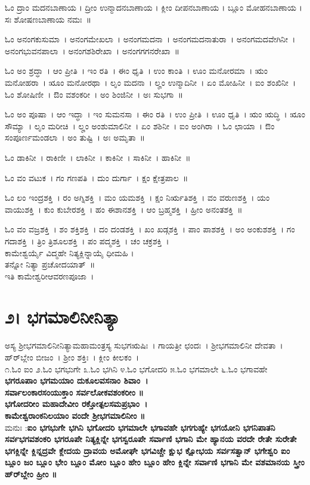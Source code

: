 ಓಂ ದ್ರಾಂ ಮದನಬಾಣಾಯ ।  ದ್ರೀಂ ಉನ್ಮಾದನಬಾಣಾಯ ।  ಕ್ಲೀಂ ದೀಪನಬಾಣಾಯ ।  ಬ್ಲೂಂ ಮೋಹನಬಾಣಾಯ ।  ಸಃ ಶೋಷಣಬಾಣಾಯ ನಮಃ~॥

ಓಂ ಅನಂಗಕುಸುಮಾ~।  ಅನಂಗಮೇಖಲಾ~।  ಅನಂಗಮದನಾ~।  ಅನಂಗಮದನಾತುರಾ~।  ಅನಂಗಮದವೇಗಿನೀ~।  ಅನಂಗಭುವನಪಾಲಾ~।  ಅನಂಗಶಶಿರೇಖಾ~।  ಅನಂಗಗಗನರೇಖಾ~॥ 

ಓಂ ಅಂ ಶ್ರದ್ಧಾ~।  ಆಂ ಪ್ರೀತಿ~।  ಇಂ ರತಿ~।  ಈಂ ಧೃತಿ~।  ಉಂ ಕಾಂತಿ~।  ಊಂ ಮನೋರಮಾ~।  ಋಂ ಮನೋಹರಾ~।  ೠಂ ಮನೋರಥಾ~।  ಲೃಂ ಮದನಾ~।  ಲೄಂ ಉನ್ಮಾದಿನೀ~।  ಏಂ ಮೋಹಿನೀ~।  ಐಂ ಶಂಖಿನೀ~। ಓಂ  ಶೋಷಿಣೀ~।  ಔಂ ವಶಂಕರೀ~।  ಅಂ ಶಿಂಜಿನೀ~।  ಅಃ ಸುಭಗಾ~॥ 

ಓಂ ಅಂ ಪೂಷಾ~।  ಆಂ ಇದ್ಧಾ~।  ಇಂ ಸುಮನಸಾ~।  ಈಂ ರತಿ~।  ಉಂ ಪ್ರೀತಿ~।  ಊಂ ಧೃತಿ~।  ಋಂ ಋದ್ಧಿ~।  ೠಂ ಸೌಮ್ಯಾ~।  ಲೃಂ ಮರೀಚಿ~।  ಲೄಂ ಅಂಶುಮಾಲಿನೀ~।  ಏಂ ಶಶಿನೀ~।  ಐಂ ಅಂಗಿರಾ~। ಓಂ ಛಾಯಾ~।  ಔಂ ಸಂಪೂರ್ಣಮಂಡಲಾ~।  ಅಂ ತುಷ್ಟಿ~।  ಅಃ ಅಮೃತಾ~॥ 

ಓಂ ಡಾಕಿನೀ~।  ರಾಕಿಣೀ~।  ಲಾಕಿನೀ~।  ಕಾಕಿನೀ~।  ಸಾಕಿನೀ~।  ಹಾಕಿನೀ~॥ 

ಓಂ ವಂ ವಟುಕ~।  ಗಂ ಗಣಪತಿ~।  ದುಂ ದುರ್ಗಾ~।  ಕ್ಷಂ ಕ್ಷೇತ್ರಪಾಲ~॥ 

ಓಂ ಲಂ ಇಂದ್ರಶಕ್ತಿ~।  ರಂ ಅಗ್ನಿಶಕ್ತಿ~।  ಮಂ ಯಮಶಕ್ತಿ~।  ಕ್ಷಂ ನಿರ್ಋತಿಶಕ್ತಿ~।  ವಂ ವರುಣಶಕ್ತಿ~।  ಯಂ ವಾಯುಶಕ್ತಿ~।  ಕುಂ ಕುಬೇರಶಕ್ತಿ~।  ಹಂ ಈಶಾನಶಕ್ತಿ~।  ಆಂ ಬ್ರಹ್ಮಶಕ್ತಿ~।  ಹ್ರೀಂ ಅನಂತಶಕ್ತಿ~॥ 

ಓಂ ವಂ ವಜ್ರಶಕ್ತಿ~।  ಶಂ ಶಕ್ತಿಶಕ್ತಿ~।  ದಂ ದಂಡಶಕ್ತಿ~।  ಖಂ ಖಡ್ಗಶಕ್ತಿ~।  ಪಾಂ ಪಾಶಶಕ್ತಿ~।  ಅಂ ಅಂಕುಶಶಕ್ತಿ~।  ಗಂ ಗದಾಶಕ್ತಿ~।  ತ್ರಿಂ ತ್ರಿಶೂಲಶಕ್ತಿ~।  ಪಂ ಪದ್ಮಶಕ್ತಿ~।  ಚಂ ಚಕ್ರಶಕ್ತಿ~।\\ ಕಾಮೇಶ್ವರ್ಯೈ ವಿದ್ಮಹೇ ನಿತ್ಯಕ್ಲಿನ್ನಾಯೈ ಧೀಮಹಿ ।\\ತನ್ನೋ ನಿತ್ಯಾ ಪ್ರಚೋದಯಾತ್~॥\\
ಇತಿ ಕಾಮೇಶ್ವರೀಆವರಣಪೂಜಾ~।
\section{೨। ಭಗಮಾಲಿನೀನಿತ್ಯಾ}
ಅಸ್ಯ ಶ್ರೀಭಗಮಾಲಿನೀನಿತ್ಯಾಮಹಾಮಂತ್ರಸ್ಯ ಸುಭಗಋಷಿಃ~। ಗಾಯತ್ರೀ ಛಂದಃ~। ಶ್ರೀಭಗಮಾಲಿನೀ ದೇವತಾ~। ಹ್‌ರ್‌ಬ್ಲೇಂ ಬೀಜಂ~।  ಶ್ರೀಂ ಶಕ್ತಿಃ~। ಕ್ಲೀಂ ಕೀಲಕಂ~।\\
೧.ಓಂ ಐಂ  ೨.ಓಂ ಭಗಭುಗೇ ೩.ಓಂ ಭಗಿನಿ  ೪.ಓಂ ಭಗೋದರಿ  ೫.ಓಂ ಭಗಮಾಲೇ ೬.ಓಂ ಭಗಾವಹೇ\\
{\bfseries ಭಗರೂಪಾಂ ಭಗಮಯಾಂ ದುಕೂಲವಸನಾಂ ಶಿವಾಂ~।\\
ಸರ್ವಾಲಂಕಾರಸಂಯುಕ್ತಾಂ ಸರ್ವಲೋಕವಶಂಕರೀಂ ॥\\
ಭಗೋದರೀಂ ಮಹಾದೇವೀಂ ರಕ್ತೋತ್ಪಲಸಮಪ್ರಭಾಂ~।\\
ಕಾಮೇಶ್ವರಾಂಕನಿಲಯಾಂ ವಂದೇ ಶ್ರೀಭಗಮಾಲಿನೀಂ ॥\\}
ಮನುಃ :{\bfseries  ಐಂ ಭಗಭುಗೇ ಭಗಿನಿ ಭಗೋದರಿ ಭಗಮಾಲೇ ಭಗಾವಹೇ ಭಗಗುಹ್ಯೇ ಭಗಯೋನಿ ಭಗನಿಪಾತನಿ ಸರ್ವಭಗವಶಂಕರಿ ಭಗರೂಪೇ ನಿತ್ಯಕ್ಲಿನ್ನೇ ಭಗಸ್ವರೂಪೇ ಸರ್ವಾಣಿ ಭಗಾನಿ ಮೇ ಹ್ಯಾನಯ ವರದೇ ರೇತೇ ಸುರೇತೇ ಭಗಕ್ಲಿನ್ನೇ ಕ್ಲಿನ್ನದ್ರವೇ ಕ್ಲೇದಯ ದ್ರಾವಯ ಅಮೋಘೇ ಭಗವಿಚ್ಚೇ ಕ್ಷುಭ ಕ್ಷೋಭಯ ಸರ್ವಸತ್ವಾನ್ ಭಗೇಶ್ವರಿ ಐಂ ಬ್ಲೂಂ ಜಂ ಬ್ಲೂಂ ಭೇಂ ಬ್ಲೂಂ ಮೋಂ ಬ್ಲೂಂ ಹೇಂ ಬ್ಲೂಂ ಹೇಂ ಕ್ಲಿನ್ನೇ ಸರ್ವಾಣಿ ಭಗಾನಿ ಮೇ ವಶಮಾನಯ ಸ್ತ್ರೀಂ ಹ್‌ರ್‌ಬ್ಲೇಂ ಹ್ರೀಂ ॥}

